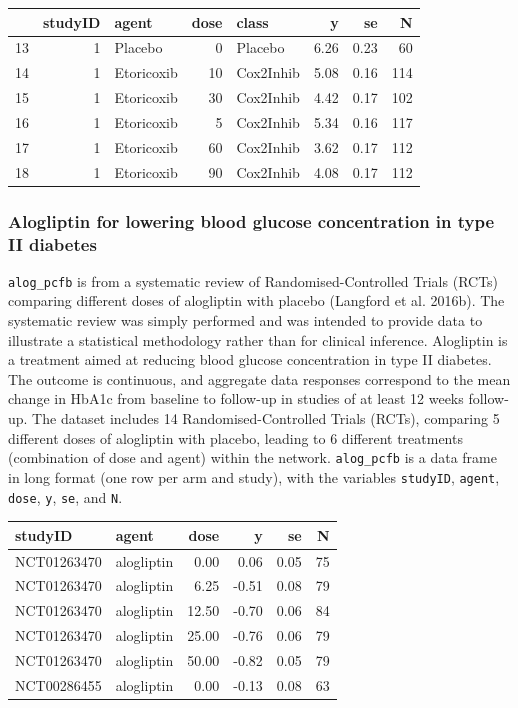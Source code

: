 \documentclass[]{article}
\begin{document}
\begin{longtable}[]{@{}lrlrlrrr@{}}
\toprule
& studyID & agent & dose & class & y & se & N\tabularnewline
\midrule
\endhead
13 & 1 & Placebo & 0 & Placebo & 6.26 & 0.23 & 60\tabularnewline
14 & 1 & Etoricoxib & 10 & Cox2Inhib & 5.08 & 0.16 & 114\tabularnewline
15 & 1 & Etoricoxib & 30 & Cox2Inhib & 4.42 & 0.17 & 102\tabularnewline
16 & 1 & Etoricoxib & 5 & Cox2Inhib & 5.34 & 0.16 & 117\tabularnewline
17 & 1 & Etoricoxib & 60 & Cox2Inhib & 3.62 & 0.17 & 112\tabularnewline
18 & 1 & Etoricoxib & 90 & Cox2Inhib & 4.08 & 0.17 & 112\tabularnewline
\bottomrule
\end{longtable}

\hypertarget{alogliptin-for-lowering-blood-glucose-concentration-in-type-ii-diabetes}{%
\subsubsection{Alogliptin for lowering blood glucose concentration in
type II
diabetes}\label{alogliptin-for-lowering-blood-glucose-concentration-in-type-ii-diabetes}}

\texttt{alog\_pcfb} is from a systematic review of Randomised-Controlled
Trials (RCTs) comparing different doses of alogliptin with placebo
(Langford et al. 2016b). The systematic review was simply performed and
was intended to provide data to illustrate a statistical methodology
rather than for clinical inference. Alogliptin is a treatment aimed at
reducing blood glucose concentration in type II diabetes. The outcome is
continuous, and aggregate data responses correspond to the mean change
in HbA1c from baseline to follow-up in studies of at least 12 weeks
follow-up. The dataset includes 14 Randomised-Controlled Trials (RCTs),
comparing 5 different doses of alogliptin with placebo, leading to 6
different treatments (combination of dose and agent) within the network.
\texttt{alog\_pcfb} is a data frame in long format (one row per arm and
study), with the variables \texttt{studyID}, \texttt{agent},
\texttt{dose}, \texttt{y}, \texttt{se}, and \texttt{N}.

\begin{longtable}[]{@{}llrrrr@{}}
\toprule
studyID & agent & dose & y & se & N\tabularnewline
\midrule
\endhead
NCT01263470 & alogliptin & 0.00 & 0.06 & 0.05 & 75\tabularnewline
NCT01263470 & alogliptin & 6.25 & -0.51 & 0.08 & 79\tabularnewline
NCT01263470 & alogliptin & 12.50 & -0.70 & 0.06 & 84\tabularnewline
NCT01263470 & alogliptin & 25.00 & -0.76 & 0.06 & 79\tabularnewline
NCT01263470 & alogliptin & 50.00 & -0.82 & 0.05 & 79\tabularnewline
NCT00286455 & alogliptin & 0.00 & -0.13 & 0.08 & 63\tabularnewline
\bottomrule
\end{longtable}
\end{document}
